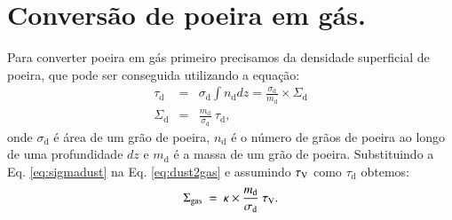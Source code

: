 \section{Conversão de poeira em gás.}
\label{sec:gasfrac:gas2dust}

Para converter poeira em gás primeiro precisamos da densidade superficial de poeira, que pode ser
conseguida utilizando a equação:
\begin{eqnarray}
	\tau_{\mathrm{d}} &=& \sigma_{\mathrm{d}} \int n_{\mathrm{d}} dz =
	\frac{\sigma_{\mathrm{d}}}{m_{\mathrm{d}}}\times\Sigma_{\mathrm{d}}
	\\
	\Sigma_{\mathrm{d}} &=& \frac{m_{\mathrm{d}}}{\sigma_{\mathrm{d}}}\ \tau_{\mathrm{d}},
	\label{eq:sigmadust}
\end{eqnarray}
\noindent onde $\sigma_{\mathrm{d}}$ é área de um grão de poeira, $n_{\mathrm{d}}$ é o número de
grãos de poeira ao longo de uma profundidade $dz$ e $m_{\mathrm{d}}$ é a massa de um grão de
poeira. Substituindo a Eq. \ref{eq:sigmadust} na Eq. \ref{eq:dust2gas} e assumindo $\tau_{\mathrm{V}}$ como
$\tau_{\mathrm{d}}$ obtemos:
\begin{equation}
	\Sigma_{\mathrm{gas}}\ =\ \kappa \times \frac{m_{\mathrm{d}}}{\sigma_{\mathrm{d}}}\ \tau_{\mathrm{V}}. 
	\label{eq:dust2gas_tauV}
\end{equation}

